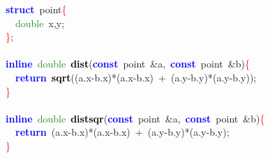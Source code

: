 
{\ttfamily \raggedright {
\noindent
\mbox{}\textbf{\textcolor{Blue}{struct}}\ point\textcolor{Red}{\{} \\
\mbox{}\ \ \textcolor{ForestGreen}{double}\ x\textcolor{BrickRed}{,}y\textcolor{BrickRed}{;} \\
\mbox{}\textcolor{Red}{\}}\textcolor{BrickRed}{;} \\
\mbox{} \\
\mbox{}\textbf{\textcolor{Blue}{inline}}\ \textcolor{ForestGreen}{double}\ \textbf{\textcolor{Black}{dist}}\textcolor{BrickRed}{(}\textbf{\textcolor{Blue}{const}}\ point\ \textcolor{BrickRed}{\&}a\textcolor{BrickRed}{,}\ \textbf{\textcolor{Blue}{const}}\ point\ \textcolor{BrickRed}{\&}b\textcolor{BrickRed}{)}\textcolor{Red}{\{} \\
\mbox{}\ \ \textbf{\textcolor{Blue}{return}}\ \textbf{\textcolor{Black}{sqrt}}\textcolor{BrickRed}{((}a\textcolor{BrickRed}{.}x\textcolor{BrickRed}{-}b\textcolor{BrickRed}{.}x\textcolor{BrickRed}{)*(}a\textcolor{BrickRed}{.}x\textcolor{BrickRed}{-}b\textcolor{BrickRed}{.}x\textcolor{BrickRed}{)}\ \textcolor{BrickRed}{+}\ \textcolor{BrickRed}{(}a\textcolor{BrickRed}{.}y\textcolor{BrickRed}{-}b\textcolor{BrickRed}{.}y\textcolor{BrickRed}{)*(}a\textcolor{BrickRed}{.}y\textcolor{BrickRed}{-}b\textcolor{BrickRed}{.}y\textcolor{BrickRed}{));} \\
\mbox{}\textcolor{Red}{\}} \\
\mbox{} \\
\mbox{}\textbf{\textcolor{Blue}{inline}}\ \textcolor{ForestGreen}{double}\ \textbf{\textcolor{Black}{distsqr}}\textcolor{BrickRed}{(}\textbf{\textcolor{Blue}{const}}\ point\ \textcolor{BrickRed}{\&}a\textcolor{BrickRed}{,}\ \textbf{\textcolor{Blue}{const}}\ point\ \textcolor{BrickRed}{\&}b\textcolor{BrickRed}{)}\textcolor{Red}{\{} \\
\mbox{}\ \ \textbf{\textcolor{Blue}{return}}\ \textcolor{BrickRed}{(}a\textcolor{BrickRed}{.}x\textcolor{BrickRed}{-}b\textcolor{BrickRed}{.}x\textcolor{BrickRed}{)*(}a\textcolor{BrickRed}{.}x\textcolor{BrickRed}{-}b\textcolor{BrickRed}{.}x\textcolor{BrickRed}{)}\ \textcolor{BrickRed}{+}\ \textcolor{BrickRed}{(}a\textcolor{BrickRed}{.}y\textcolor{BrickRed}{-}b\textcolor{BrickRed}{.}y\textcolor{BrickRed}{)*(}a\textcolor{BrickRed}{.}y\textcolor{BrickRed}{-}b\textcolor{BrickRed}{.}y\textcolor{BrickRed}{);} \\
\mbox{}\textcolor{Red}{\}} \\
}}
